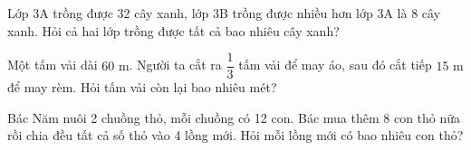\begin{ex} %
Lớp 3A trồng được 32 cây xanh, lớp 3B trồng được nhiều hơn lớp 3A là 8 cây xanh. Hỏi cả hai lớp trồng được tất cả bao nhiêu cây xanh?
\end{ex}

\begin{ex} %
Một tấm vải dài $60\text{ m}$. Người ta cắt ra $\dfrac{1}{3}$ tấm vải để may áo, sau đó cắt tiếp $15\text{ m}$ để may rèm. Hỏi tấm vải còn lại bao nhiêu mét?
\end{ex}

\begin{ex} %
Bác Năm nuôi 2 chuồng thỏ, mỗi chuồng có 12 con. Bác mua thêm 8 con thỏ nữa rồi chia đều tất cả số thỏ vào 4 lồng mới. Hỏi mỗi lồng mới có bao nhiêu con thỏ?
\end{ex}
